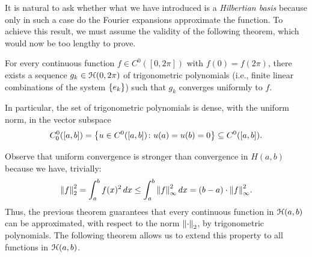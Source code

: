 It is natural to ask whether what we have introduced is a \emph{Hilbertian
basis} because only in such a case do the Fourier expansions approximate the
function. To achieve this result, we must assume the validity of the following
theorem, which would now be too lengthy to prove.

\begin{theorem}
For every continuous function $f\in C^0([0,2\pi])$ with $f(0)=f(2\pi)$, there
exists a sequence $g_k\in \mathcal H(0,2\pi)$ of trigonometric polynomials (i.e., finite
linear combinations of the system ${\left\{ e_k \right\}}$) such that $g_k$ converges
uniformly to $f$.

In particular, the set of trigonometric polynomials is dense, with the uniform
norm, in the vector subspace
\[
  C^0_0([a,b]) 
  = {\left\{ u\in C^0([a,b])\colon u(a)=u(b)=0 \right\}}
  \subseteq C^0([a,b]).
\]
\end{theorem}

Observe that uniform convergence is stronger than convergence in $H(a,b)$
because we have, trivially:
\[
  {\left\Vert f\right\Vert}_2^2 = \int_a^b f(x)^2\, dx
  \le \int_a^b {\left\Vert f\right\Vert}_\infty^2\, dx
  = (b-a) \cdot {\left\Vert f\right\Vert}_\infty^2.
\]
Thus, the previous theorem guarantees that every continuous function in
$\mathcal H(a,b)$ can be approximated, with respect to the norm ${\left\Vert \cdot\right\Vert}_2$, by
trigonometric polynomials. The following theorem allows us to extend this
property to all functions in $\mathcal H(a,b)$.

